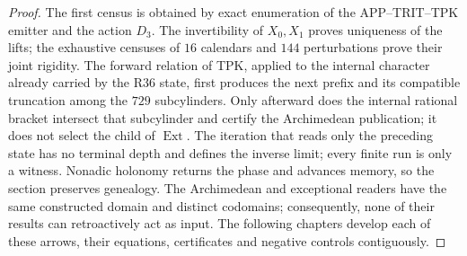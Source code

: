 \begin{proof}
The first census is obtained by exact enumeration of the APP--TRIT--TPK emitter and
the action \(D_3\). The invertibility of \(X_0,X_1\) proves uniqueness of the
lifts; the exhaustive censuses of \(16\) calendars and \(144\)
perturbations prove their joint rigidity. The forward relation of TPK,
applied to the internal character already carried by the R36 state, first produces the
next prefix and its compatible truncation among the \(729\)
subcylinders. Only afterward does the internal rational bracket intersect that
subcylinder and certify the Archimedean publication; it does not select the child of
\(\operatorname{Ext}\). The iteration that reads only the preceding state has no
terminal depth and defines the inverse limit; every finite run is
only a witness. Nonadic holonomy returns the phase and advances memory, so
the section preserves genealogy. The Archimedean and
exceptional readers have the same constructed domain and distinct codomains;
consequently, none of their results can retroactively act as
input. The following chapters develop each of
these arrows, their equations, certificates and negative controls contiguously.
\end{proof}

